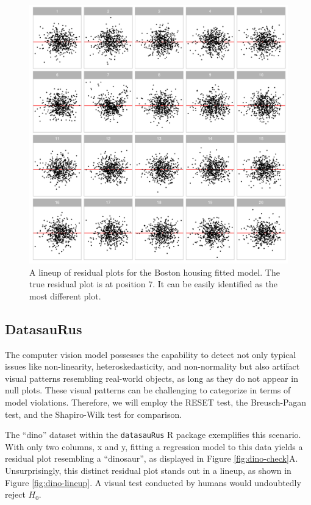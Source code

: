 \documentclass[]{interact}
\theoremstyle{plain}%
\theoremstyle{definition}
\theoremstyle{remark}
\begin{document}
\begin{figure}[!h]

{\centering \includegraphics[width=1\linewidth]{paper_files/figure-latex/boston-lineup-1} 

}

\caption{A lineup of residual plots for the Boston housing fitted model. The true residual plot is at position 7. It can be easily identified as the most different plot.}\label{fig:boston-lineup}
\end{figure}

\subsection{DatasauRus}\label{datasaurus}

The computer vision model possesses the capability to detect not only
typical issues like non-linearity, heteroskedasticity, and non-normality
but also artifact visual patterns resembling real-world objects, as long
as they do not appear in null plots. These visual patterns can be
challenging to categorize in terms of model violations. Therefore, we
will employ the RESET test, the Breusch-Pagan test, and the Shapiro-Wilk
test \citep{shapiro1965analysis} for comparison.

The ``dino'' dataset within the \texttt{datasauRus} R package
exemplifies this scenario. With only two columns, x and y, fitting a
regression model to this data yields a residual plot resembling a
``dinosaur'', as displayed in Figure \ref{fig:dino-check}A.
Unsurprisingly, this distinct residual plot stands out in a lineup, as
shown in Figure \ref{fig:dino-lineup}. A visual test conducted by humans
would undoubtedly reject \(H_0\).
\end{document}
